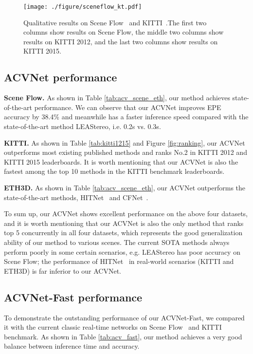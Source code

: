 \documentclass[10pt,twocolumn,letterpaper]{article}
\begin{document}
\begin{figure*}
\centering
\texttt{[image: ./figure/sceneflow\_kt.pdf]} \caption{Qualitative results on Scene Flow~\cite{dispNetC2016large} and KITTI~\cite{geiger2012we, menze2015joint}.The first two columns show results on Scene Flow, the middle two columns show results on KITTI 2012, and the last two columns show results on KITTI 2015.}
\label{fig:sceneflow_kt}
\vspace{-15pt}
\end{figure*}


\subsection{ACVNet performance} \label{sec:acv_benchmark}
\textbf{Scene Flow.} 
As shown in Table \ref{tab:acv_scene_eth}, our method achieves state-of-the-art performance. We can observe that our ACVNet improves EPE accuracy by 38.4\% and meanwhile has a faster inference speed compared with the state-of-the-art method LEAStereo\cite{cheng2020hierarchical}, i.e. 0.2s vs. 0.3s.

\textbf{KITTI.} As shown in Table \ref{tab:kitti1215} and Figure \ref{fig:ranking}, our ACVNet outperforms most  existing  published methods and ranks No.2 in KITTI 2012 and KITTI 2015 leaderboards. 
It is worth mentioning that our ACVNet is also the fastest among the top 10 methods in the KITTI benchmark leaderboards.

\textbf{ETH3D.} As shown in Table \ref{tab:acv_scene_eth}, our ACVNet outperforms the state-of-the-art methods, HITNet~\cite{tankovich2021hitnet} and CFNet~\cite{shen2021cfnet}.


To sum up, our ACVNet shows excellent performance on the above four datasets, and it is worth mentioning that our ACVNet is also the only method that ranks top 5 concurrently in all four datasets, which represents the good generalization ability of our method to various scenes. The current SOTA methods always perform poorly in some certain scenarios, e.g. LEAStereo\cite{cheng2020hierarchical} has poor accuracy on Scene Flow; the performance of HITNet~\cite{tankovich2021hitnet} in real-world scenarios (KITTI and ETH3D) is far inferior to our ACVNet.

\subsection{ACVNet-Fast performance} \label{sec:AcvNet-fast performance}
To demonstrate the outstanding performance of our ACVNet-Fast, we compared it with the current classic real-time networks on Scene Flow~\cite{dispNetC2016large} and KITTI~\cite{geiger2012we, menze2015joint} benchmark. As shown in Table \ref{tab:acv_fast}, our method achieves a very good balance between inference time and accuracy.
\end{document}
